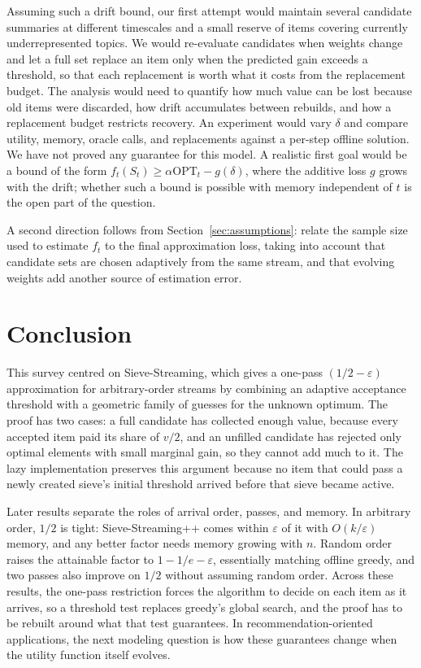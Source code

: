 \documentclass[10pt]{article}
\newcommand{\OPT}{\mathrm{OPT}}
\begin{document}
Assuming such a drift bound, our first attempt would maintain several candidate summaries at different timescales and a small reserve of items covering currently underrepresented topics. We would re-evaluate candidates when weights change and let a full set replace an item only when the predicted gain exceeds a threshold, so that each replacement is worth what it costs from the replacement budget. The analysis would need to quantify how much value can be lost because old items were discarded, how drift accumulates between rebuilds, and how a replacement budget restricts recovery. An experiment would vary $\delta$ and compare utility, memory, oracle calls, and replacements against a per-step offline solution. We have not proved any guarantee for this model. A realistic first goal would be a bound of the form $f_t(S_t)\geq\alpha\OPT_t-g(\delta)$, where the additive loss $g$ grows with the drift; whether such a bound is possible with memory independent of $t$ is the open part of the question.

A second direction follows from Section~\ref{sec:assumptions}: relate the sample size used to estimate $f_t$ to the final approximation loss, taking into account that candidate sets are chosen adaptively from the same stream, and that evolving weights add another source of estimation error.

\section{Conclusion}
This survey centred on Sieve-Streaming, which gives a one-pass $(1/2-\varepsilon)$ approximation for arbitrary-order streams by combining an adaptive acceptance threshold with a geometric family of guesses for the unknown optimum. The proof has two cases: a full candidate has collected enough value, because every accepted item paid its share of $v/2$, and an unfilled candidate has rejected only optimal elements with small marginal gain, so they cannot add much to it. The lazy implementation preserves this argument because no item that could pass a newly created sieve's initial threshold arrived before that sieve became active.

Later results separate the roles of arrival order, passes, and memory. In arbitrary order, $1/2$ is tight: Sieve-Streaming++ comes within $\varepsilon$ of it with $O(k/\varepsilon)$ memory, and any better factor needs memory growing with $n$. Random order raises the attainable factor to $1-1/e-\varepsilon$, essentially matching offline greedy, and two passes also improve on $1/2$ without assuming random order. Across these results, the one-pass restriction forces the algorithm to decide on each item as it arrives, so a threshold test replaces greedy's global search, and the proof has to be rebuilt around what that test guarantees. In recommendation-oriented applications, the next modeling question is how these guarantees change when the utility function itself evolves.
\end{document}
